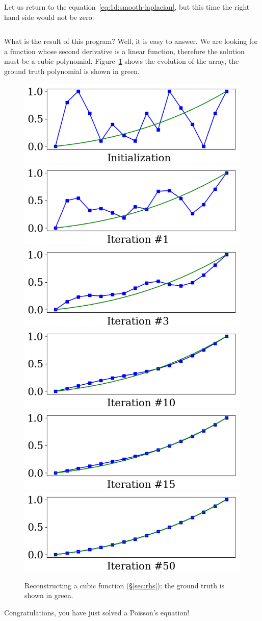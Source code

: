 \documentclass[notitlepage,oneside]{book}
\begin{document}
Let us return to the equation~\eqref{eq:1d:smooth-laplacian}, but this time the right hand side would not be zero:
\inputminted[frame=single,linenos=true]{python}{listings/example_3.4.py}
What is the result of this program? Well, it is easy to answer. We are looking for a function whose second derivative is a linear function,
therefore the solution must be a cubic polynomial. Figure~\ref{fig:linsys-cubic} shows the evolution of the array, the ground truth polynomial is shown in green.

\begin{figure}[ht]
    \centering
    \includegraphics[width=.32\linewidth]{img/example_3.4_0.png}
    \includegraphics[width=.32\linewidth]{img/example_3.4_1.png}
    \includegraphics[width=.32\linewidth]{img/example_3.4_2.png}
    \includegraphics[width=.32\linewidth]{img/example_3.4_3.png}
    \includegraphics[width=.32\linewidth]{img/example_3.4_4.png}
    \includegraphics[width=.32\linewidth]{img/example_3.4_5.png}
    \caption{Reconstructing a cubic function (\S\ref{sec:rhs}); the ground truth is shown in green.}
    \label{fig:linsys-cubic}
\end{figure}

Congratulations, you have just solved a Poisson's equation!
\end{document}
